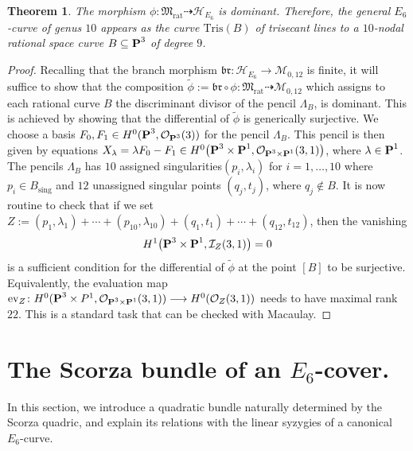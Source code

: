 \documentclass[11pt]{amsart}
\newtheorem{theorem}{Theorem}[section]
\theoremstyle{definition}
\def\PP{{\textbf P}}
\def\OO{\mathcal{O}}
\def\I{\mathcal{I}}
\def\cM{\mathcal{M}}
\def\cH{\mathcal{H}}
\begin{document}
\begin{theorem}\label{thm:parametrization}
The morphism $\phi\colon \mathfrak{M}_{\mathrm{rat}}\dashrightarrow \cH_{E_6}$ is dominant. Therefore, the general $E_6$-curve of genus $10$ appears as the curve $\mathrm{Tris}(B)$ of trisecant lines to a $10$-nodal rational space curve $B\subseteq \PP^3$ of degree $9$. 
\end{theorem}
\begin{proof}
Recalling that the branch morphism $\mathfrak{br} \colon \cH_{E_6} \rightarrow \cM_{0,12}$ is finite, it will suffice to show that the composition $\widetilde{\phi}:=\mathfrak{br}\circ \phi\colon \mathfrak{M}_{\mathrm{rat}}\dashrightarrow \cM_{0,12}$ which assigns to each rational curve $B$ the discriminant divisor of the pencil $\Lambda_B$, is dominant. This is achieved by showing that the differential of $\widetilde{\phi}$ is generically surjective. We choose a basis $F_0, F_1\in H^0(\PP^3, \OO_{\PP^3}(3))$ for the pencil $\Lambda_B$. This pencil is then given by equations $X_{\lambda}=\lambda F_0-F_1\in H^0\bigl(\PP^3\times \PP^1, \OO_{\PP^3\times \PP^1}(3,1)\bigr)$, where $\lambda \in \PP^1$. The pencils $\Lambda_B$ has $10$ assigned singularities$(p_i,\lambda_i)$ for $i=1, \ldots, 10$ where $p_i\in B_{\mathrm{sing}}$ and $12$ unassigned singular points $(q_j, t_j)$, where $q_j\notin B$. It is now routine to check that if we set $Z:=(p_1,\lambda_1)+\cdots+(p_{10}, \lambda_{10})+(q_1,t_1)+\cdots+(q_{12},t_{12})$, then the vanishing 
$$
H^1\bigl(\PP^3\times \PP^1, \I_Z(3,1)\bigr)=0
$$
is a sufficient condition for the differential of $\widetilde{\phi}$ at the point $[B]$ to be surjective. Equivalently, the evaluation map
$\mathrm{ev}_Z\colon H^0(\PP^3\times P^1, \OO_{\PP^3\times\PP^1}(3,1))\longrightarrow H^0(\OO_Z(3,1))$ needs to have maximal rank $22$. This is a standard task that can be checked with Macaulay. 
\end{proof}



\section{The Scorza bundle of an $E_6$-cover.}
In this section, we introduce a quadratic bundle naturally determined by the Scorza quadric, and explain its relations with the linear syzygies of a canonical $E_6$-curve.
\end{document}
